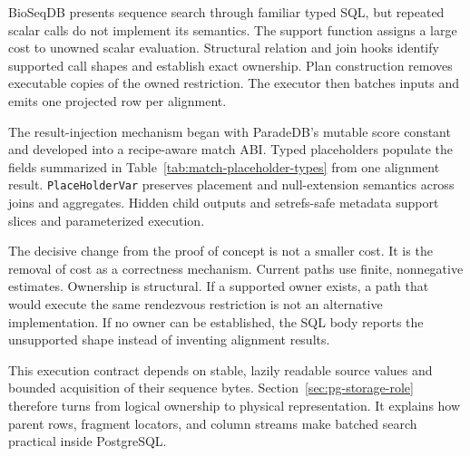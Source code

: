 BioSeqDB presents sequence search through familiar typed SQL, but repeated
scalar calls do not implement its semantics.  The support function assigns a
large cost to unowned scalar evaluation.  Structural relation and join hooks
identify supported call shapes and establish exact ownership.  Plan
construction removes executable copies of the owned restriction.  The
executor then batches inputs and emits one projected row per alignment.

The result-injection mechanism began with ParadeDB's mutable score constant
and developed into a recipe-aware match ABI.  Typed placeholders populate the
fields summarized in Table~\ref{tab:match-placeholder-types} from one alignment
result.  \texttt{PlaceHolderVar} preserves placement and null-extension
semantics across joins and aggregates.  Hidden child outputs and setrefs-safe
metadata support slices and parameterized execution.

The decisive change from the proof of concept is not a smaller cost.  It is the
removal of cost as a correctness mechanism.  Current paths use finite,
nonnegative estimates.  Ownership is structural.  If a supported owner exists,
a path that would execute the same rendezvous restriction is not an alternative
implementation.  If no owner can be established, the SQL body reports the
unsupported shape instead of inventing alignment results.

This execution contract depends on stable, lazily readable source values and
bounded acquisition of their sequence bytes.
Section~\ref{sec:pg-storage-role} therefore turns from logical ownership to
physical representation.  It explains how parent rows, fragment locators, and
column streams make batched search practical inside PostgreSQL.